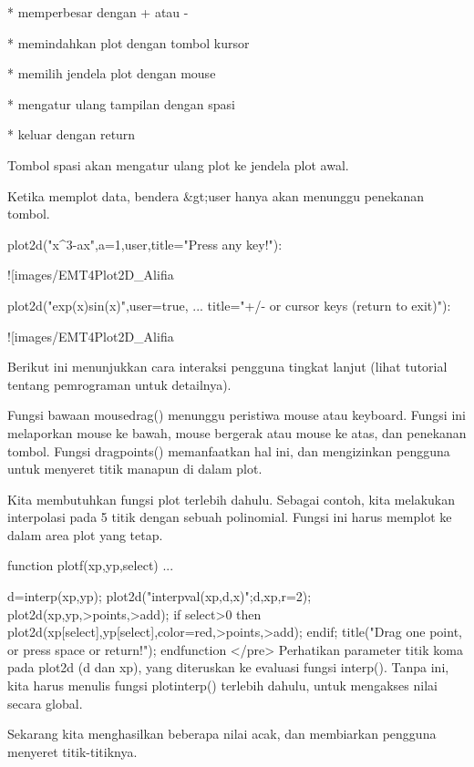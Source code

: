 \documentclass{article}
\begin{document}
* 
memperbesar dengan + atau -

* 
memindahkan plot dengan tombol kursor

* 
memilih jendela plot dengan mouse

* 
mengatur ulang tampilan dengan spasi

* 
keluar dengan return


Tombol spasi akan mengatur ulang plot ke jendela plot awal.


Ketika memplot data, bendera &gt;user hanya akan menunggu penekanan
tombol.


\>plot2d({{"x^3-a\*x",a=1}},\>user,title="Press any key!"):


![images/EMT4Plot2D_Alifia%

\>plot2d("exp(x)\*sin(x)",user=true, ...  
\>     title="+/- or cursor keys (return to exit)"):


![images/EMT4Plot2D_Alifia%

Berikut ini menunjukkan cara interaksi pengguna tingkat lanjut (lihat
tutorial tentang pemrograman untuk detailnya).


Fungsi bawaan mousedrag() menunggu peristiwa mouse atau keyboard.
Fungsi ini melaporkan mouse ke bawah, mouse bergerak atau mouse ke
atas, dan penekanan tombol. Fungsi dragpoints() memanfaatkan hal ini,
dan mengizinkan pengguna untuk menyeret titik manapun di dalam plot.


Kita membutuhkan fungsi plot terlebih dahulu. Sebagai contoh, kita
melakukan interpolasi pada 5 titik dengan sebuah polinomial. Fungsi
ini harus memplot ke dalam area plot yang tetap.


\>function plotf(xp,yp,select) ...


      d=interp(xp,yp);
      plot2d("interpval(xp,d,x)";d,xp,r=2);
      plot2d(xp,yp,>points,>add);
      if select>0 then
        plot2d(xp[select],yp[select],color=red,>points,>add);
      endif;
      title("Drag one point, or press space or return!");
    endfunction
</pre>
Perhatikan parameter titik koma pada plot2d (d dan xp), yang
diteruskan ke evaluasi fungsi interp(). Tanpa ini, kita harus menulis
fungsi plotinterp() terlebih dahulu, untuk mengakses nilai secara
global.


Sekarang kita menghasilkan beberapa nilai acak, dan membiarkan
pengguna menyeret titik-titiknya.
\end{document}
